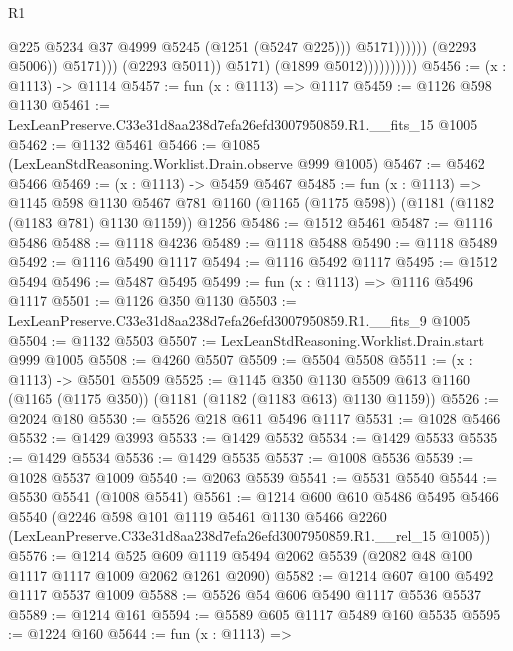\begin{lexlean}{R1}
\begin{coremodule}
                                                @225
                                                @5234
                                                @37
                                                @4999
                                                @5245
                                                (@1251 (@5247 @225)))
                                              @5171))))))
                                  (@2293 @5006))
                                @5171)))
                          (@2293 @5011))
                        @5171)
                      (@1899 @5012))))))))))
@5456 := (x : @1113) -> @1114
@5457 := fun (x : @1113) => @1117
@5459 := @1126 @598 @1130
@5461 := LexLeanPreserve.C33e31d8aa238d7efa26efd3007950859.R1.__fits_15 @1005
@5462 := @1132 @5461
@5466 := @1085 (LexLeanStdReasoning.Worklist.Drain.observe @999 @1005)
@5467 := @5462 @5466
@5469 := (x : @1113) -> @5459 @5467
@5485 := fun (x : @1113) =>
  @1145
    @598
    @1130
    @5467
    @781
    @1160
    (@1165 (@1175 @598))
    (@1181 (@1182 (@1183 @781) @1130 @1159))
    @1256
@5486 := @1512 @5461
@5487 := @1116 @5486
@5488 := @1118 @4236
@5489 := @1118 @5488
@5490 := @1118 @5489
@5492 := @1116 @5490 @1117
@5494 := @1116 @5492 @1117
@5495 := @1512 @5494
@5496 := @5487 @5495
@5499 := fun (x : @1113) => @1116 @5496 @1117
@5501 := @1126 @350 @1130
@5503 := LexLeanPreserve.C33e31d8aa238d7efa26efd3007950859.R1.__fits_9 @1005
@5504 := @1132 @5503
@5507 := LexLeanStdReasoning.Worklist.Drain.start @999 @1005
@5508 := @4260 @5507
@5509 := @5504 @5508
@5511 := (x : @1113) -> @5501 @5509
@5525 := @1145
    @350
    @1130
    @5509
    @613
    @1160
    (@1165 (@1175 @350))
    (@1181 (@1182 (@1183 @613) @1130 @1159))
@5526 := @2024 @180
@5530 := @5526 @218 @611 @5496 @1117
@5531 := @1028 @5466
@5532 := @1429 @3993
@5533 := @1429 @5532
@5534 := @1429 @5533
@5535 := @1429 @5534
@5536 := @1429 @5535
@5537 := @1008 @5536
@5539 := @1028 @5537 @1009
@5540 := @2063 @5539
@5541 := @5531 @5540
@5544 := @5530 @5541 (@1008 @5541)
@5561 := @1214
    @600
    @610
    @5486
    @5495
    @5466
    @5540
    (@2246
      @598
      @101
      @1119
      @5461
      @1130
      @5466
      @2260
      (LexLeanPreserve.C33e31d8aa238d7efa26efd3007950859.R1.__rel_15 @1005))
@5576 := @1214
    @525
    @609
    @1119
    @5494
    @2062
    @5539
    (@2082 @48 @100 @1117 @1117 @1009 @2062 @1261 @2090)
@5582 := @1214 @607 @100 @5492 @1117 @5537 @1009
@5588 := @5526 @54 @606 @5490 @1117 @5536 @5537
@5589 := @1214 @161
@5594 := @5589 @605 @1117 @5489 @160 @5535
@5595 := @1224 @160
@5644 := fun (x : @1113) =>

\end{coremodule}
\end{lexlean}
